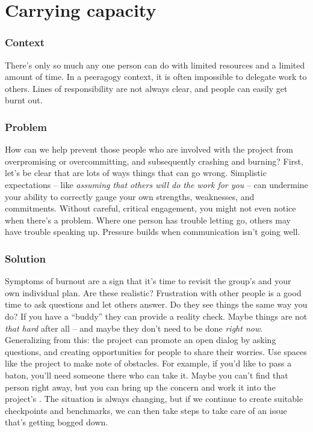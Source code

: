 \section{Carrying capacity}\label{sec:Carrying capacity}

\subsubsection*{Context}

There's only so much any one person can do with limited resources and a limited amount of time. In a peeragogy context, it is often impossible to delegate work to others.  Lines of responsibility are not always clear, and people can easily get burnt out. 

\subsubsection*{Problem}

How can we help prevent those people who are involved with the project from overpromising or overcommitting, and subsequently crashing and burning?  First, let's be clear that are lots of ways things that can go wrong.  Simplistic expectations -- like \emph{assuming that others will do the work for you} \cite{torvalds-interview} -- can undermine your ability to correctly gauge your own strengths, weaknesses, and commitments.  Without careful, critical engagement, you might not even notice when there's a problem.  Where one person has trouble letting go, others may have trouble speaking up.  Pressure builds when communication isn't going well.  

\subsubsection*{Solution}

Symptoms of burnout are a sign that it's time to revisit the group's  and your own individual plan.  Are these realistic?  Frustration with other people is a good time to ask questions and let others answer.  Do they see things the same way you do?   If you have a ``buddy'' they can provide a reality check.   Maybe things are not \emph{that hard} after all -- and maybe they don't need to be done \emph{right now}.  Generalizing from this: the project can promote an open dialog by asking questions, and creating opportunities for people to share their worries.  Use spaces like the project  to make note of obstacles.  For example, if you'd like to pass a baton, you'll need someone there who can take it.  Maybe you can't find that person right away, but you can bring up the concern and work it into the project's .  The situation is always changing, but if we continue to create suitable checkpoints and benchmarks, we can then take steps to take care of an issue that's getting bogged down.    

